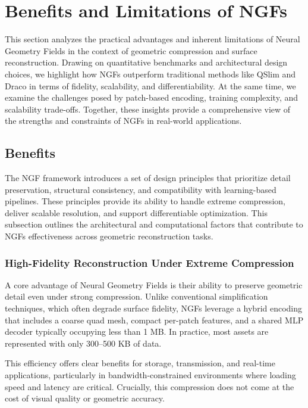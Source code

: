 \section{Benefits and Limitations of NGFs}\label{Sec:Evaluation}

This section analyzes the practical advantages and inherent limitations of Neural Geometry Fields in the context of geometric compression and surface reconstruction. 
Drawing on quantitative benchmarks and architectural design choices, we highlight how NGFs outperform traditional methods like QSlim and Draco in terms of fidelity, scalability, and differentiability. 
At the same time, we examine the challenges posed by patch-based encoding, training complexity, and scalability trade-offs. 
Together, these insights provide a comprehensive view of the strengths and constraints of NGFs in real-world applications.


\subsection{Benefits}

The NGF framework introduces a set of design principles that prioritize detail preservation, structural consistency, and compatibility with learning-based pipelines. 
These principles provide its ability to handle extreme compression, deliver scalable resolution, and support differentiable optimization. 
This subsection outlines the architectural and computational factors that contribute to NGFs effectiveness across geometric reconstruction tasks.

\subsubsection{High-Fidelity Reconstruction Under Extreme Compression}

A core advantage of Neural Geometry Fields is their ability to preserve geometric detail even under strong compression. 
Unlike conventional simplification techniques, which often degrade surface fidelity, NGFs leverage a hybrid encoding that includes a coarse quad mesh, compact per-patch features, and a shared MLP decoder typically occupying less than 1 MB. 
In practice, most assets are represented with only 300--500 KB of data. 

This efficiency offers clear benefits for storage, transmission, and real-time applications, particularly in bandwidth-constrained environments where loading speed and latency are critical. 
Crucially, this compression does not come at the cost of visual quality or geometric accuracy. 

